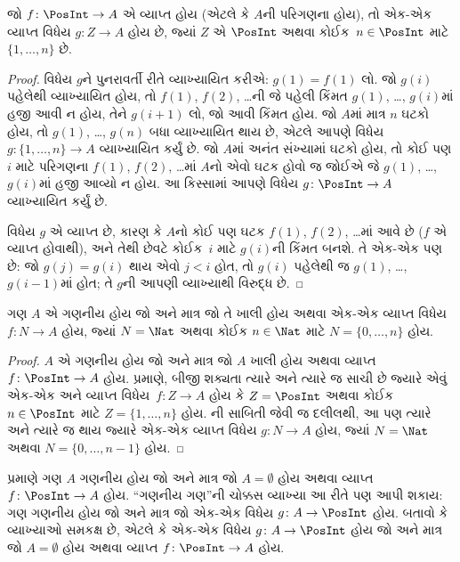 \begin{prop}
જો $f\colon \PosInt \to A$ એ વ્યાપ્ત
હોય (એટલે કે $A$ની પરિગણના હોય), તો
એક-એક વ્યાપ્ત વિધેય $g\colon Z \to A$ હોય છે, જ્યાં
$Z$ એ $\PosInt$ અથવા કોઈક~$n \in \PosInt$
માટે $\{1, \dots, n\}$ છે.
\end{prop}

\begin{proof}
વિધેય $g$ને પુનરાવર્તી રીતે વ્યાખ્યાયિત કરીએ:
$g(1) = f(1)$ લો. જો $g(i)$ પહેલેથી વ્યાખ્યાયિત હોય,
તો $f(1)$, $f(2)$, \dots{}ની જે પહેલી કિંમત
$g(1)$, \dots, $g(i)$માં હજી આવી ન હોય,
તેને $g(i+1)$ લો, જો આવી કિંમત હોય.
જો $A$માં માત્ર $n$ ઘટકો હોય, તો
$g(1)$, \dots, $g(n)$ બધા વ્યાખ્યાયિત થાય છે,
એટલે આપણે વિધેય $g\colon \{1, \dots, n\}
\to A$ વ્યાખ્યાયિત કર્યું છે. જો $A$માં અનંત
સંખ્યામાં ઘટકો હોય, તો કોઈ પણ $i$ માટે
પરિગણના $f(1)$, $f(2)$, \dots{}માં $A$નો એવો
ઘટક હોવો જ જોઈએ જે $g(1)$, \dots, $g(i)$માં
હજી આવ્યો ન હોય. આ કિસ્સામાં આપણે વિધેય
$g\colon \PosInt \to A$ વ્યાખ્યાયિત કર્યું છે.

વિધેય $g$ એ વ્યાપ્ત છે, કારણ કે $A$નો
કોઈ પણ ઘટક $f(1)$, $f(2)$, \dots{}માં આવે છે
($f$ એ વ્યાપ્ત હોવાથી), અને તેથી છેવટે
કોઈક~$i$ માટે $g(i)$ની કિંમત બનશે.
તે એક-એક પણ છે: જો $g(j) = g(i)$ થાય
એવો $j < i$ હોત, તો $g(i)$ પહેલેથી જ
$g(1)$, \dots, $g(i-1)$માં હોત; તે $g$ની
આપણી વ્યાખ્યાથી વિરુદ્ધ છે.
\end{proof}

\begin{cor}
ગણ $A$ એ ગણનીય હોય જો અને માત્ર જો
તે ખાલી હોય અથવા એક-એક વ્યાપ્ત વિધેય
$f\colon N \to A$ હોય, જ્યાં $N = \Nat$
અથવા કોઈક $n \in \Nat$ માટે $N = \{0, \dots, n\}$ હોય.
\end{cor}

\begin{proof}
$A$ એ ગણનીય હોય જો અને માત્ર જો $A$
ખાલી હોય અથવા વ્યાપ્ત $f\colon \PosInt \to A$
હોય.  પ્રમાણે, બીજી શક્યતા
ત્યારે અને ત્યારે જ સાચી છે જ્યારે એવું એક-એક અને વ્યાપ્ત
વિધેય~$f\colon Z \to A$ હોય કે $Z =
\PosInt$ અથવા કોઈક $n \in \PosInt$ માટે
$Z = \{1, \dots, n\}$ હોય.
ની સાબિતી જેવી જ દલીલથી,
આ પણ ત્યારે અને ત્યારે જ થાય જ્યારે
એક-એક વ્યાપ્ત વિધેય $g\colon N \to A$ હોય, જ્યાં
$N = \Nat$ અથવા $N = \{0, \dots, n-1\}$ હોય.
\end{proof}

\begin{prob}
 પ્રમાણે ગણ $A$
ગણનીય હોય જો અને માત્ર જો $A = \emptyset$
હોય અથવા વ્યાપ્ત $f\colon
\PosInt \to A$ હોય. “ગણનીય ગણ”ની ચોક્કસ
વ્યાખ્યા આ રીતે પણ આપી શકાય: ગણ ગણનીય હોય
જો અને માત્ર જો એક-એક વિધેય
$g\colon A \to \PosInt$ હોય.
બતાવો કે વ્યાખ્યાઓ સમકક્ષ છે, એટલે કે
એક-એક વિધેય $g\colon A \to \PosInt$
હોય જો અને માત્ર જો $A = \emptyset$ હોય અથવા
વ્યાપ્ત $f\colon \PosInt \to A$ હોય.
\end{prob}
\endgroup


